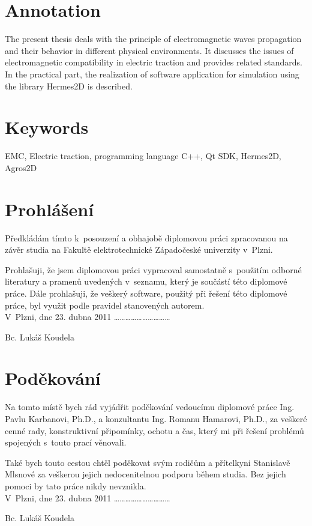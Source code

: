 \bigskip

\section*{Annotation}

The present thesis deals with the principle of electromagnetic waves propagation and their behavior in different physical environments. It discusses the issues of electromagnetic compatibility in electric traction and provides related standards. In the practical part, the realization of software application for simulation using the library Hermes2D is described.

\section*{Keywords}
EMC, Electric traction, programming language C++, Qt SDK, Hermes2D, Agros2D
\newpage

\section*{Prohlášení}
Předkládám tímto k~posouzení a obhajobě diplomovou práci zpracovanou na závěr studia na Fakultě elektrotechnické Západočeské univerzity v~Plzni.

Prohlašuji, že jsem diplomovou práci vypracoval samostatně s~použitím odborné literatury a pramenů uvedených v~seznamu, který je součástí této diplomové práce.
Dále prohlašuji, že veškerý software, použitý při řešení této diplomové práce, byl využit podle pravidel stanovených autorem.\bigskip \bigskip \\

\noindent V~Plzni, dne 23. dubna 2011 \hfill \ldots \ldots \ldots \ldots \ldots \ldots \ldots \ldots \ldots \ldots
\noindent \begin{flushright}Bc. Lukáš Koudela ~~~~~~~\end{flushright}
\newpage

\section*{Poděkování}
Na tomto místě bych rád vyjádřit poděkování vedoucímu diplomové práce Ing. Pavlu Karbanovi, Ph.D., a konzultantu Ing. Romanu Hamarovi, Ph.D., za veškeré cenné rady, konstruktivní připomínky, ochotu a čas, který mi při řešení problémů spojených s~touto prací věnovali.

Také bych touto cestou chtěl poděkovat svým rodičům a přítelkyni Stanislavě Mlsnové za veškerou jejich nedocenitelnou podporu během studia. Bez jejich pomoci by tato práce nikdy nevznikla.\bigskip \bigskip \\

\noindent V~Plzni, dne 23. dubna 2011 \hfill \ldots \ldots \ldots \ldots \ldots \ldots \ldots \ldots \ldots \ldots
\noindent \begin{flushright}Bc. Lukáš Koudela ~~~~~~~\end{flushright}
\newpage